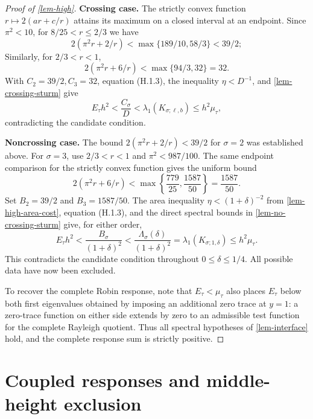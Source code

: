 \documentclass[11pt,a4paper]{article}
\theoremstyle{proofmanuscript}
\begin{document}
\begin{proof}[Proof of \ref{lem-high}]
\textbf{Crossing case.} The strictly convex function \(r\mapsto2(ar+c/r)\) attains its maximum on a closed interval at an endpoint. Since \(\pi^2<10\), for \(8/25<r\le2/3\) we have \[
2(\pi^2r+2/r)<\max\{189/10,58/3\}<39/2;
\] Similarly, for \(2/3<r<1\), \[
2(\pi^2r+6/r)<\max\{94/3,32\}=32.
\] With \(C_2=39/2,C_3=32\), equation (H.1.3), the inequality \(\eta<D^{-1}\), and \ref{lem-crossing-sturm} give \[
E_\tau h^2<\frac{C_\sigma}{D}
<\lambda_1(K_{\sigma;\ell,b})\le h^2\mu_\tau,
\] contradicting the candidate condition.

\textbf{Noncrossing case.} The bound \(2(\pi^2r+2/r)<39/2\) for \(\sigma=2\) was established above. For \(\sigma=3\), use \(2/3<r<1\) and \(\pi^2<987/100\). The same endpoint comparison for the strictly convex function gives the uniform bound \[
2(\pi^2r+6/r)
<\max\left\{\frac{779}{25},\frac{1587}{50}\right\}
=\frac{1587}{50}.
\] Set \(B_2=39/2\) and \(B_3=1587/50\). The area inequality \(\eta<(1+\delta)^{-2}\) from \ref{lem-high-area-cost}, equation (H.1.3), and the direct spectral bounds in \ref{lem-no-crossing-sturm} give, for either order, \[
E_\tau h^2
<\frac{B_\sigma}{(1+\delta)^2}
<\frac{\Lambda_\sigma(\delta)}{(1+\delta)^2}
=\lambda_1(K_{\sigma;1,\delta})
\le h^2\mu_\tau.
\] This contradicts the candidate condition throughout \(0\le\delta\le1/4\). All possible data have now been excluded.

To recover the complete Robin response, note that \(E_\tau<\mu_\tau\) also places \(E_\tau\) below both first eigenvalues obtained by imposing an additional zero trace at \(y=1\): a zero-trace function on either side extends by zero to an admissible test function for the complete Rayleigh quotient. Thus all spectral hypotheses of \ref{lem-interface} hold, and the complete response sum is strictly positive.

\end{proof}


\section{Coupled responses and middle-height exclusion}
\end{document}
